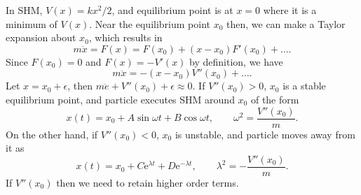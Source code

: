 \documentclass[letter-paper]{tufte-book}
\newenvironment{example}[1][Example]{\begin{trivlist}
\item[\hskip \labelsep {\bfseries #1}]}{\end{trivlist}}
\newcommand{\ex}{\mathrm{e}}
\begin{document}
\begin{example}
  In SHM, $V(x) = kx^2 / 2$, and equilibrium point is at $x=0$ where it is a
  minimum of $V(x)$. Near the equilibrium point $x_0$ then, we can make a Taylor
  expansion about $x_0$, which results in
  \begin{equation*}
    m\ddot{x} = F(x) = F(x_0) + (x - x_0) F'(x_0) + \ldots.
  \end{equation*}
  Since $F(x_0) = 0$ and $F(x) = -V'(x)$ by definition, we have
  \begin{equation*}
    m\ddot{x} = -(x - x_0) V''(x_0) + \ldots.
  \end{equation*}
  Let $x = x_0 + \epsilon$, then $m\ddot{e} + V''(x_0) + \epsilon \approx 0$. If
  $V''(x_0) > 0$, $x_0$ is a stable equilibrium point, and particle executes SHM
  around $x_0$ of the form
  \begin{equation*}
    x(t) = x_0 + A\sin\omega t + B\cos\omega t, \qquad
    \omega^2 = \frac{V''(x_0)}{m}.
  \end{equation*}
  On the other hand, if $V''(x_0) < 0$, $x_0$ is unstable, and particle moves
  away from it as
  \begin{equation*}
    x(t) = x_0 + C\ex^{\lambda t} + D\ex^{-\lambda t}, \qquad
    \lambda^2 = -\frac{V''(x_0)}{m}.
  \end{equation*}
  If $V''(x_0)$ then we need to retain higher order terms.
\end{example}
\end{document}
